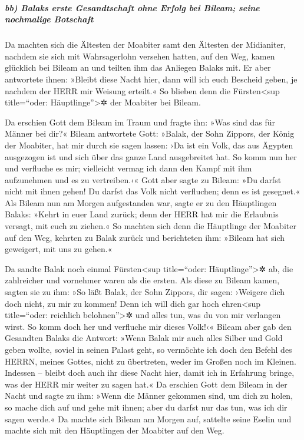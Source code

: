 \hypertarget{bb-balaks-erste-gesandtschaft-ohne-erfolg-bei-bileam-seine-nochmalige-botschaft}{%
\subparagraph{bb) Balaks erste Gesandtschaft ohne Erfolg bei Bileam;
seine nochmalige
Botschaft}\label{bb-balaks-erste-gesandtschaft-ohne-erfolg-bei-bileam-seine-nochmalige-botschaft}}

Da machten sich die Ältesten der Moabiter samt den
Ältesten der Midianiter, nachdem sie sich mit Wahrsagerlohn versehen
hatten, auf den Weg, kamen glücklich bei Bileam an und teilten ihm das
Anliegen Balaks mit. Er aber antwortete ihnen: »Bleibt
diese Nacht hier, dann will ich euch Bescheid geben, je nachdem der HERR
mir Weisung erteilt.« So blieben denn die Fürsten\textless sup
title=``oder: Häuptlinge''\textgreater✲ der Moabiter bei Bileam.

Da erschien Gott dem Bileam im Traum und fragte ihn: »Was
sind das für Männer bei dir?« Bileam antwortete Gott:
»Balak, der Sohn Zippors, der König der Moabiter, hat mir durch sie
sagen lassen: ›Da ist ein Volk, das aus Ägypten
ausgezogen ist und sich über das ganze Land ausgebreitet hat. So komm
nun her und verfluche es mir; vielleicht vermag ich dann den Kampf mit
ihm aufzunehmen und es zu vertreiben.‹« Gott aber sagte
zu Bileam: »Du darfst nicht mit ihnen gehen! Du darfst das Volk nicht
verfluchen; denn es ist gesegnet.« Als Bileam nun am
Morgen aufgestanden war, sagte er zu den Häuptlingen Balaks: »Kehrt in
euer Land zurück; denn der HERR hat mir die Erlaubnis versagt, mit euch
zu ziehen.« So machten sich denn die Häuptlinge der
Moabiter auf den Weg, kehrten zu Balak zurück und berichteten ihm:
»Bileam hat sich geweigert, mit uns zu gehen.«

Da sandte Balak noch einmal Fürsten\textless sup
title=``oder: Häuptlinge''\textgreater✲ ab, die zahlreicher und
vornehmer waren als die ersten. Als diese zu Bileam
kamen, sagten sie zu ihm: »So läßt Balak, der Sohn Zippors, dir sagen:
›Weigere dich doch nicht, zu mir zu kommen! Denn ich will
dich gar hoch ehren\textless sup title=``oder: reichlich
belohnen''\textgreater✲ und alles tun, was du von mir verlangen wirst.
So komm doch her und verfluche mir dieses Volk!‹« Bileam
aber gab den Gesandten Balaks die Antwort: »Wenn Balak mir auch alles
Silber und Gold geben wollte, soviel in seinen Palast geht, so vermöchte
ich doch den Befehl des HERRN, meines Gottes, nicht zu übertreten, weder
im Großen noch im Kleinen. Indessen -- bleibt doch auch
ihr diese Nacht hier, damit ich in Erfahrung bringe, was der HERR mir
weiter zu sagen hat.« Da erschien Gott dem Bileam in der
Nacht und sagte zu ihm: »Wenn die Männer gekommen sind, um dich zu
holen, so mache dich auf und gehe mit ihnen; aber du darfst nur das tun,
was ich dir sagen werde.« Da machte sich Bileam am Morgen
auf, sattelte seine Eselin und machte sich mit den Häuptlingen der
Moabiter auf den Weg.

